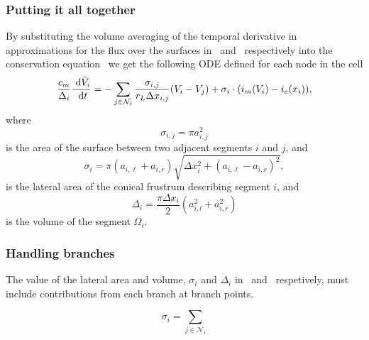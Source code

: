 \subsubsection{Putting it all together}
By substituting the volume averaging of the temporal derivative in~ approximations for the flux over the surfaces in~ and~ respectively into the conservation equation~ we get the following ODE defined for each node in the cell
\begin{equation}
    \frac{c_m}{\Delta_i} \frac{~\text{d}{\bar{V}_i}}{~\text{d}{t}}
       = -\sum_{j\in\mathcal{N}_i} {\frac{\sigma_{i,j}}{r_L \Delta x_{i,j}} (V_i-V_j)} + \sigma_i\cdot(i_m(V_i) - i_e(x_i)),
    \label{eq:ode}
\end{equation}
where
\begin{equation}
    \sigma_{i,j} = \pi a_{i,j}^2
    \label{eq:sigma_ij}
\end{equation}
is the area of the surface between two adjacent segments $i$ and $j$, and
\begin{equation}
    \sigma_{i}   = \pi(a_{i,\ell} + a_{i,r}) \sqrt{\Delta x_i^2 + (a_{i,\ell} - a_{i,r})^2},
    \label{eq:sigma_i}
\end{equation}
is the lateral area of the conical frustrum describing segment $i$, and
\begin{equation}
    \Delta_{i}   = \frac{\pi\Delta x_i}{2} \left( a_{i,l}^2 + a_{i,r}^2 \right)
    \label{eq:delta_i}
\end{equation}
is the volume of the segment $\Omega_i$.

\subsubsection{Handling branches}
The value of the lateral area and volume, $\sigma_i$ and $\Delta_i$ in~ and~ respetively, must include contributions from each branch at branch points.



\begin{equation}
    \sigma_i = \sum_{j\in\mathcal{N}_i} {}
\end{equation}

